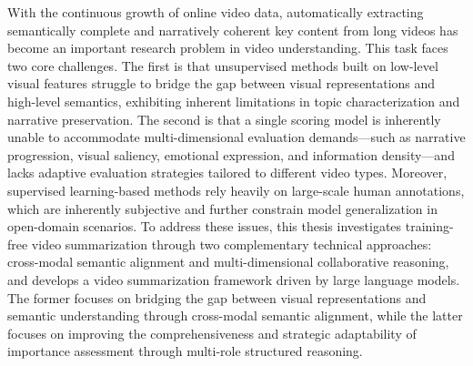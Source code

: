 
\begin{englishabstract}
With the continuous growth of online video data, automatically extracting semantically complete and narratively coherent key content from long videos has become an important research problem in video understanding. This task faces two core challenges. The first is that unsupervised methods built on low-level visual features struggle to bridge the gap between visual representations and high-level semantics, exhibiting inherent limitations in topic characterization and narrative preservation. The second is that a single scoring model is inherently unable to accommodate multi-dimensional evaluation demands---such as narrative progression, visual saliency, emotional expression, and information density---and lacks adaptive evaluation strategies tailored to different video types. Moreover, supervised learning-based methods rely heavily on large-scale human annotations, which are inherently subjective and further constrain model generalization in open-domain scenarios. To address these issues, this thesis investigates training-free video summarization through two complementary technical approaches: cross-modal semantic alignment and multi-dimensional collaborative reasoning, and develops a video summarization framework driven by large language models. The former focuses on bridging the gap between visual representations and semantic understanding through cross-modal semantic alignment, while the latter focuses on improving the comprehensiveness and strategic adaptability of importance assessment through multi-role structured reasoning.


\end{englishabstract}
